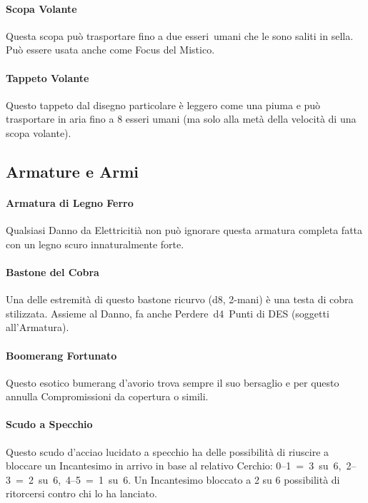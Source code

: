 \documentclass[itdr]{subfiles}
\begin{document}
\vfill
\paragraph{Scopa Volante}
Questa scopa può trasportare fino a due \mbox{esseri umani} che le sono saliti in sella. Può essere usata anche come Focus del Mistico.

\vfill
\paragraph{Tappeto Volante}
Questo tappeto dal disegno particolare è leggero come una piuma e può trasportare in aria fino a 8 esseri umani (ma solo alla metà della velocità di una scopa volante).

\vfill
\break

\subsection*{Armature e Armi}

\paragraph{Armatura di Legno Ferro}
Qualsiasi Danno da Elettricitià non può ignorare questa \mbox{armatura} completa fatta con un legno scuro innaturalmente forte.

\paragraph{Bastone del Cobra}
Una delle estremità di questo bastone ricurvo (d8, 2-mani) è una testa di cobra stilizzata. Assieme al Danno, fa anche Perdere~d4~Punti di DES (soggetti all'Armatura).

\paragraph{Boomerang Fortunato}
Questo esotico bumerang d'avorio trova sempre il suo bersaglio e per questo annulla Compromissioni da copertura o simili.

\paragraph{Scudo a Specchio}
Questo scudo d'acciao lucidato a specchio ha delle possibilità di riuscire a bloccare un Incantesimo in arrivo in base al relativo Cerchio: \mbox{0--1 = 3 su 6, 2--3 = 2 su 6, 4--5 = 1 su 6}. Un Incantesimo bloccato a 2 su 6 possibilità di ritorcersi contro chi lo ha lanciato.
\end{document}
